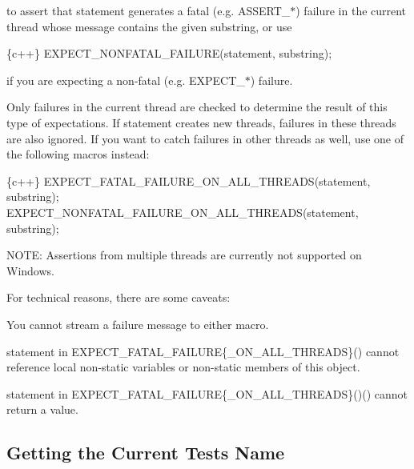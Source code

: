 to assert that {\ttfamily statement} generates a fatal (e.\+g. {\ttfamily A\+S\+S\+E\+R\+T\+\_\+$\ast$}) failure in the current thread whose message contains the given {\ttfamily substring}, or use


\begin{DoxyCode}
\{c++\}
  EXPECT\_NONFATAL\_FAILURE(statement, substring);
\end{DoxyCode}


if you are expecting a non-\/fatal (e.\+g. {\ttfamily E\+X\+P\+E\+C\+T\+\_\+$\ast$}) failure.

Only failures in the current thread are checked to determine the result of this type of expectations. If {\ttfamily statement} creates new threads, failures in these threads are also ignored. If you want to catch failures in other threads as well, use one of the following macros instead\+:


\begin{DoxyCode}
\{c++\}
  EXPECT\_FATAL\_FAILURE\_ON\_ALL\_THREADS(statement, substring);
  EXPECT\_NONFATAL\_FAILURE\_ON\_ALL\_THREADS(statement, substring);
\end{DoxyCode}


N\+O\+TE\+: Assertions from multiple threads are currently not supported on Windows.

For technical reasons, there are some caveats\+:


\begin{DoxyEnumerate}
\item You cannot stream a failure message to either macro.
\end{DoxyEnumerate}
\begin{DoxyEnumerate}
\item {\ttfamily statement} in {\ttfamily E\+X\+P\+E\+C\+T\+\_\+\+F\+A\+T\+A\+L\+\_\+\+F\+A\+I\+L\+U\+RE\{\+\_\+\+O\+N\+\_\+\+A\+L\+L\+\_\+\+T\+H\+R\+E\+A\+DS\}()} cannot reference local non-\/static variables or non-\/static members of {\ttfamily this} object.
\end{DoxyEnumerate}
\begin{DoxyEnumerate}
\item {\ttfamily statement} in {\ttfamily E\+X\+P\+E\+C\+T\+\_\+\+F\+A\+T\+A\+L\+\_\+\+F\+A\+I\+L\+U\+RE\{\+\_\+\+O\+N\+\_\+\+A\+L\+L\+\_\+\+T\+H\+R\+E\+A\+DS\}()()} cannot return a value.
\end{DoxyEnumerate}

\subsection*{Getting the Current Test\textquotesingle{}s Name}


